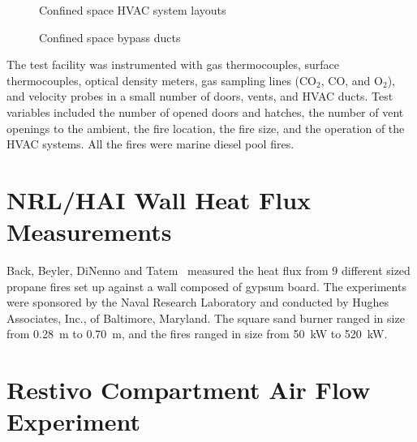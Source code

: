 \begin{figure}[ht]
\begin{center}
\end{center}
\caption{Confined space HVAC system layouts}
\label{confined_HVAC}
\end{figure}

\begin{figure}[ht]
\begin{center}
\end{center}
\caption{Confined space bypass ducts}
\label{confined_bypass}
\end{figure}

The test facility was instrumented with gas thermocouples, surface thermocouples, optical density meters, gas sampling lines (CO$_2$, CO, and O$_2$),
and velocity probes in a small number of doors, vents, and HVAC ducts.  Test variables included the number of opened doors and hatches, the number of vent openings to the ambient,
the fire location, the fire size, and the operation of the HVAC systems.  All the fires were marine diesel pool fires.

\clearpage

\section{NRL/HAI Wall Heat Flux Measurements}

Back, Beyler, DiNenno and Tatem~\cite{Back:IAFSS4} measured the heat flux from 9 different sized propane fires set up against a wall composed
of gypsum board. The experiments were sponsored by the Naval Research Laboratory and conducted by Hughes Associates, Inc., of Baltimore, Maryland. The
square sand burner ranged in size from 0.28~m to 0.70~m, and the fires ranged in size from 50~kW to 520~kW.


\section{Restivo Compartment Air Flow Experiment}

